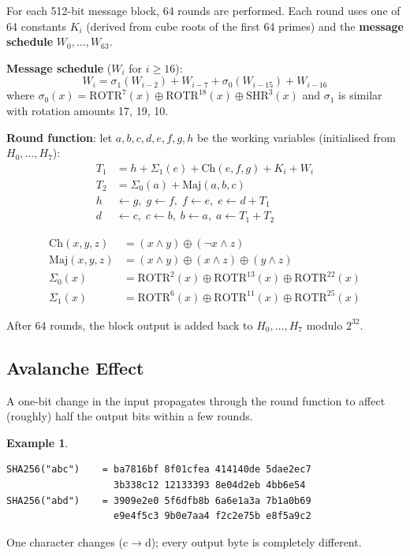 \documentclass[12pt,a4paper,openany]{book}
\theoremstyle{definition}
\newtheorem{example}{Example}[chapter]
\theoremstyle{plain}
\theoremstyle{remark}
\begin{document}
For each 512-bit message block, 64 rounds are performed.  Each round
uses one of 64 constants $K_i$ (derived from cube roots of the first 64
primes) and the \textbf{message schedule} $W_0,\ldots,W_{63}$.

\textbf{Message schedule} ($W_i$ for $i\geq 16$):
\[
W_i = \sigma_1(W_{i-2}) + W_{i-7} + \sigma_0(W_{i-15}) + W_{i-16}
\]
where $\sigma_0(x)=\mathrm{ROTR}^7(x)\oplus\mathrm{ROTR}^{18}(x)\oplus\mathrm{SHR}^3(x)$
and $\sigma_1$ is similar with rotation amounts 17, 19, 10.

\textbf{Round function}: let $a,b,c,d,e,f,g,h$ be the working variables
(initialised from $H_0,\ldots,H_7$):
\begin{align}
  T_1 &= h + \Sigma_1(e) + \mathrm{Ch}(e,f,g) + K_i + W_i \\
  T_2 &= \Sigma_0(a) + \mathrm{Maj}(a,b,c) \\
  h&\gets g,\; g\gets f,\; f\gets e,\; e\gets d+T_1 \\
  d&\gets c,\; c\gets b,\; b\gets a,\; a\gets T_1+T_2
\end{align}

\begin{align*}
  \mathrm{Ch}(x,y,z)  &= (x\wedge y)\oplus(\neg x\wedge z) \\
  \mathrm{Maj}(x,y,z) &= (x\wedge y)\oplus(x\wedge z)\oplus(y\wedge z) \\
  \Sigma_0(x)         &= \mathrm{ROTR}^{2}(x)\oplus\mathrm{ROTR}^{13}(x)\oplus\mathrm{ROTR}^{22}(x) \\
  \Sigma_1(x)         &= \mathrm{ROTR}^{6}(x)\oplus\mathrm{ROTR}^{11}(x)\oplus\mathrm{ROTR}^{25}(x)
\end{align*}

After 64 rounds, the block output is added back to $H_0,\ldots,H_7$
modulo $2^{32}$.

\subsection{Avalanche Effect}

A one-bit change in the input propagates through the round function to
affect (roughly) half the output bits within a few rounds.

\begin{example}
\begin{lstlisting}[language={}]
SHA256("abc")    = ba7816bf 8f01cfea 414140de 5dae2ec7
                   3b338c12 12133393 8e04d2eb 4bb6e54
SHA256("abd")    = 3909e2e0 5f6dfb8b 6a6e1a3a 7b1a0b69
                   e9e4f5c3 9b0e7aa4 f2c2e75b e8f5a9c2
\end{lstlisting}
One character changes (c$\to$d); every output byte is completely different.
\end{example}
\end{document}
